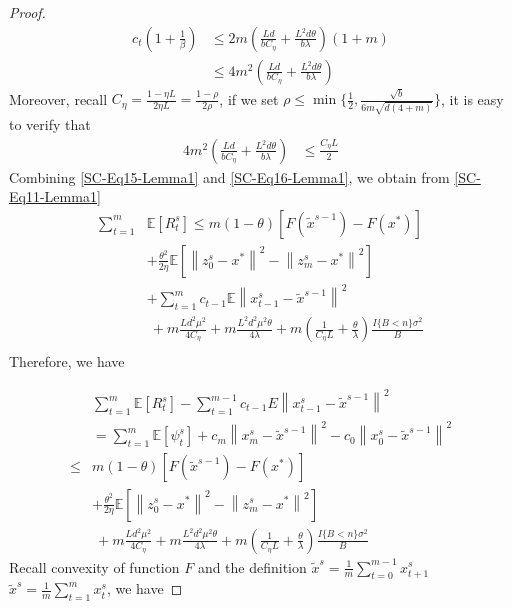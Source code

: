 \documentclass{article}
\newcommand*{\E}{\mathbb{E}}
\newcommand{\norm}[1]{\left\lVert#1\right\rVert}
\theoremstyle{definition}
\theoremstyle{remark}
\begin{document}
{\begin{proof}
\begin{equation}\label{SC-Eq15-Lemma1}
\begin{split}
c_{t}(1+\frac{1}{\beta})&\leq 2m(\frac{Ld}{bC_{\eta} }+\frac{L^2d\theta}{b\lambda })(1+m)\\
&\leq 4m^2(\frac{Ld}{bC_{\eta} }+\frac{L^2d\theta}{b\lambda })
\end{split}
\end{equation}\label{SC-Eq16-Lemma1}
Moreover, recall $C_{\eta} = \frac{1-\eta L}{2\eta L} = \frac{1-\rho}{2\rho}$, if we set $\rho\leq \min\{\frac{1}{2},\frac{\sqrt{b}}{6m\sqrt{d(4+m)}}\}$, it is easy to verify that
 \begin{align}
 4m^2(\frac{Ld}{bC_{\eta} }+\frac{L^2d\theta}{b\lambda }) &\leq \frac{C_{\eta} L}{2}\label{SC-Eq16-Lemma1}
\end{align} 
Combining \eqref{SC-Eq15-Lemma1} and \eqref{SC-Eq16-Lemma1},  we obtain from \eqref{SC-Eq11-Lemma1}
\begin{equation}
\begin{split}
\sum_{t=1}^{m} &\E[R_{t}^s]\leq m(1-\theta)[F(\widetilde{x}^{s-1})-F(x^*)] \\
&+ {\frac{ \theta^2}{2\eta}}\E[\norm{z_{0}^s-x^*}^2-\norm{z_{m}^s-x^*}^2]\\
&+ \sum_{t=1}^{m} c_{t-1}\E\norm{x_{t-1}^s-\widetilde{x}^{s-1}}^2\\
&~+m\frac{Ld^2\mu^2}{4C_{\eta}}+m\frac{ L^2d^2\mu^2\theta}{4\lambda}+m(\frac{1}{C_{\eta} L}+\frac{\theta}{\lambda})\frac{I\{B < n\} \sigma ^2}{B}\\
\end{split}
\end{equation}
Therefore, we have

\begin{equation}\label{SC-Eq17-Lemma1}
\begin{split}
&\sum_{t=1}^{m} \E[R_{t}^s]-\sum_{t=1}^{m-1}c_{t-1} E\norm{x_{t-1}^s-\widetilde{x}^{s-1}}^2\\
&= \sum_{t=1}^{m}\E[\psi_{t}^s] + c_{m}\norm{x_{m}^s-\widetilde{x}^{s-1}}^2-c_{0}\norm{x_{0}^s-\widetilde{x}^{s-1}}^2\\
\leq &m(1-\theta)[F(\widetilde{x}^{s-1})-F(x^*)] \\
&+ {\frac{ \theta^2}{2\eta}}\E[\norm{z_{0}^s-x^*}^2-\norm{z_{m}^s-x^*}^2]\\
&~+m\frac{Ld^2\mu^2}{4C_{\eta}}+m\frac{ L^2d^2\mu^2\theta}{4\lambda}+m(\frac{1}{C_{\eta} L}+\frac{\theta}{\lambda})\frac{I\{B < n\} \sigma ^2}{B}
\end{split}
\end{equation}
Recall convexity of function $F$ and the definition $\widetilde{x}^s = \frac{1}{m}\sum_{t=0}^{m-1}x_{t+1}^s$ $\widetilde{x}^s = \frac{1}{m}\sum_{t=1}^{m}x_{t}^s$, we have 


\end{proof}}
\end{document}
